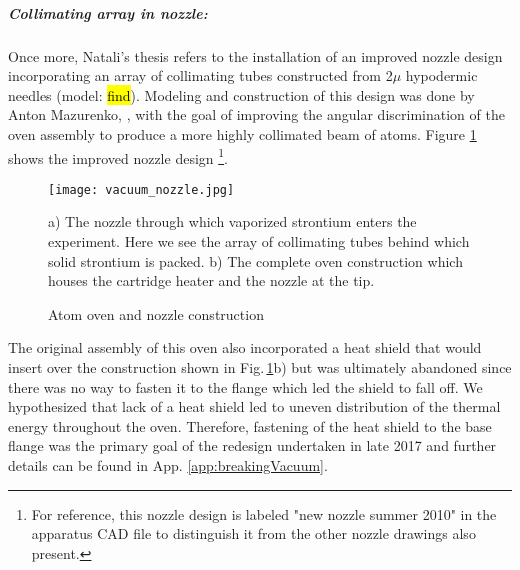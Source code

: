 \subparagraph{Collimating array in nozzle:}
Once more, Natali's thesis refers to the installation of an improved nozzle design incorporating an array of collimating tubes constructed from 2$\mu$ hypodermic needles (model: \hl{find}). 
Modeling and construction of this design was done by Anton Mazurenko, \cite{Mazurenko2010}, with the goal of improving the angular discrimination of the oven assembly to produce a more highly collimated beam of atoms.
Figure \ref{fig:2010_nozzle} shows the improved nozzle design \footnote{For reference, this nozzle design is labeled "new nozzle summer 2010" in the apparatus CAD file to distinguish it from the other nozzle drawings also present.}.
	\begin{figure}
		\centerline{
		\texttt{[image: vacuum\_nozzle.jpg]}}
		\caption{Atom oven and nozzle construction}{a) The nozzle through which vaporized strontium enters the experiment. Here we see the array of collimating tubes behind which solid strontium is packed. b) The complete oven construction which houses the cartridge heater and the nozzle at the tip.}
		\label{fig:2010_nozzle}
	\end{figure}
The original assembly of this oven also incorporated a heat shield that would insert over the construction shown in Fig.\,\ref{fig:2010_nozzle}b) but was ultimately abandoned since there was no way to fasten it to the flange which led the shield to fall off.
We hypothesized that lack of a heat shield led to uneven distribution of the thermal energy throughout the oven.
Therefore, fastening of the heat shield to the base flange was the primary goal of the redesign undertaken in late 2017 and further details can be found in App. \ref{app:breakingVacuum}.  
 
